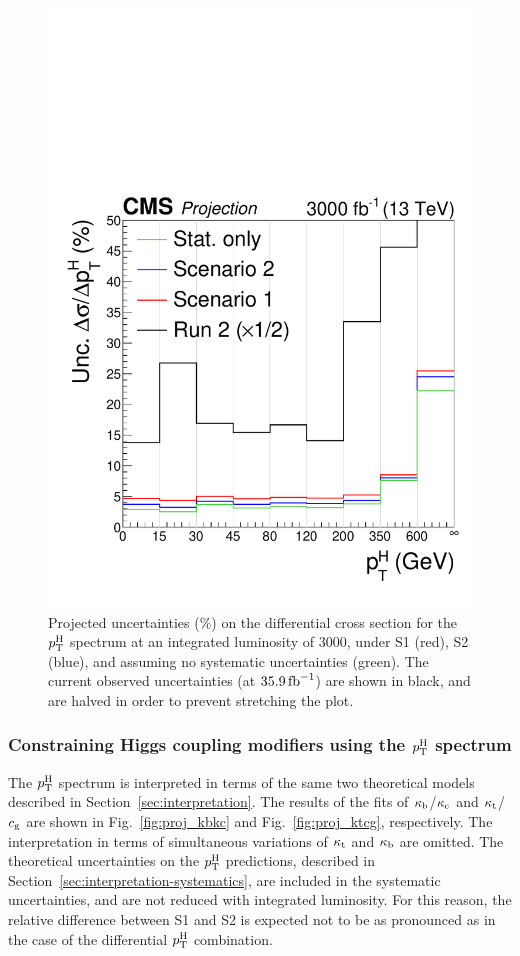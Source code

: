 \begin{figure}[hbtp]
  \begin{center}
    \includegraphics[width=0.49\linewidth]{img/projections/hllhc-pth-unc-scenarios.pdf}
    \caption{
        Projected uncertainties (\%) on the differential cross section for the $p_\mathrm{T}^\mathrm{H}$ spectrum at an integrated luminosity of 3000\fbinv, under S1 (red), S2 (blue), and assuming no systematic uncertainties (green).
        The current observed uncertainties (at $35.9\,\text{fb}^{-1}$) are shown in black, and are halved in order to prevent stretching the plot.
        }
    \label{fig:hllhc-pth-unc-scenarios}
  \end{center}
\end{figure}


\subsubsection{Constraining Higgs coupling modifiers using the \texorpdfstring{$p_\mathrm{T}^\mathrm{H}$}{pTH} spectrum}

The $p_\mathrm{T}^\mathrm{H}$ spectrum is interpreted in terms of the same two theoretical models described in Section~\ref{sec:interpretation}.
% 
The results of the fits of $\kappa_{\mathrm{b}}$/$\kappa_{\mathrm{c}}$ and $\kappa_{\mathrm{t}}$/$c_\mathrm{g}$ are shown in Fig.~\ref{fig:proj_kbkc} and Fig.~\ref{fig:proj_ktcg}, respectively.
% 
The interpretation in terms of simultaneous variations of $\kappa_{\mathrm{t}}$ and $\kappa_{\mathrm{b}}$ are omitted.
% 
The theoretical uncertainties on the $p_\mathrm{T}^\mathrm{H}$ predictions, described in Section~\ref{sec:interpretation-systematics}, are included in the systematic uncertainties, and are not reduced with integrated luminosity.
% 
For this reason, the relative difference between S1 and S2 is expected not to be as pronounced as in the case of the differential $p_\mathrm{T}^\mathrm{H}$ combination.


